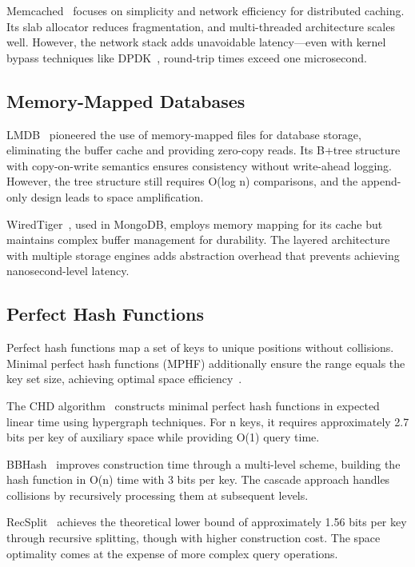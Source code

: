 \documentclass[11pt]{article}
\begin{document}
Memcached~\cite{memcached} focuses on simplicity and network efficiency for distributed caching. Its slab allocator reduces fragmentation, and multi-threaded architecture scales well. However, the network stack adds unavoidable latency—even with kernel bypass techniques like DPDK~\cite{dpdk}, round-trip times exceed one microsecond.

\subsection{Memory-Mapped Databases}

LMDB~\cite{lmdb} pioneered the use of memory-mapped files for database storage, eliminating the buffer cache and providing zero-copy reads. Its B+tree structure with copy-on-write semantics ensures consistency without write-ahead logging. However, the tree structure still requires O(log n) comparisons, and the append-only design leads to space amplification.

WiredTiger~\cite{wiredtiger}, used in MongoDB, employs memory mapping for its cache but maintains complex buffer management for durability. The layered architecture with multiple storage engines adds abstraction overhead that prevents achieving nanosecond-level latency.

\subsection{Perfect Hash Functions}

Perfect hash functions map a set of keys to unique positions without collisions. Minimal perfect hash functions (MPHF) additionally ensure the range equals the key set size, achieving optimal space efficiency~\cite{mphf-survey}.

The CHD algorithm~\cite{chd-algorithm} constructs minimal perfect hash functions in expected linear time using hypergraph techniques. For n keys, it requires approximately 2.7 bits per key of auxiliary space while providing O(1) query time.

BBHash~\cite{bbhash} improves construction time through a multi-level scheme, building the hash function in O(n) time with 3 bits per key. The cascade approach handles collisions by recursively processing them at subsequent levels.

RecSplit~\cite{recsplit} achieves the theoretical lower bound of approximately 1.56 bits per key through recursive splitting, though with higher construction cost. The space optimality comes at the expense of more complex query operations.
\end{document}
